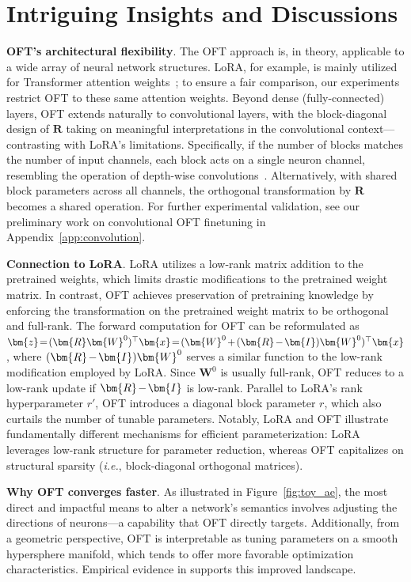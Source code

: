 \section{Intriguing Insights and Discussions}

\textbf{OFT’s architectural flexibility}. The OFT approach is, in theory, applicable to a wide array of neural network structures. LoRA, for example, is mainly utilized for Transformer attention weights~\cite{hulora2022}; to ensure a fair comparison, our experiments restrict OFT to these same attention weights. Beyond dense (fully-connected) layers, OFT extends naturally to convolutional layers, with the block-diagonal design of $\bm{R}$ taking on meaningful interpretations in the convolutional context—contrasting with LoRA's limitations. Specifically, if the number of blocks matches the number of input channels, each block acts on a single neuron channel, resembling the operation of depth-wise convolutions~\cite{chollet2017xception}. Alternatively, with shared block parameters across all channels, the orthogonal transformation by $\bm{R}$ becomes a shared operation. For further experimental validation, see our preliminary work on convolutional OFT finetuning in Appendix~\ref{app:convolution}.

\textbf{Connection to LoRA}. LoRA utilizes a low-rank matrix addition to the pretrained weights, which limits drastic modifications to the pretrained weight matrix. In contrast, OFT achieves preservation of pretraining knowledge by enforcing the transformation on the pretrained weight matrix to be orthogonal and full-rank. The forward computation for OFT can be reformulated as $\thickmuskip=2mu \medmuskip=2mu \bm{z}=(\bm{R}\bm{W}^0)^\top\bm{x}=(\bm{W}^0+(\bm{R}-\bm{I})\bm{W}^0)^\top\bm{x}$, where $\thickmuskip=2mu \medmuskip=2mu (\bm{R}-\bm{I})\bm{W}^0$ serves a similar function to the low-rank modification employed by LoRA. Since $\bm{W}^0$ is usually full-rank, OFT reduces to a low-rank update if $\thickmuskip=2mu \medmuskip=2mu \bm{R}-\bm{I}$ is low-rank. Parallel to LoRA's rank hyperparameter $r'$, OFT introduces a diagonal block parameter $r$, which also curtails the number of tunable parameters. Notably, LoRA and OFT illustrate fundamentally different mechanisms for efficient parameterization: LoRA leverages low-rank structure for parameter reduction, whereas OFT capitalizes on structural sparsity (\emph{i.e.}, block-diagonal orthogonal matrices).

\textbf{Why OFT converges faster}. As illustrated in Figure~\ref{fig:toy_ae}, the most direct and impactful means to alter a network's semantics involves adjusting the directions of neurons—a capability that OFT directly targets. Additionally, from a geometric perspective, OFT is interpretable as tuning parameters on a smooth hypersphere manifold, which tends to offer more favorable optimization characteristics. Empirical evidence in \cite{liu2021orthogonal} supports this improved landscape.

